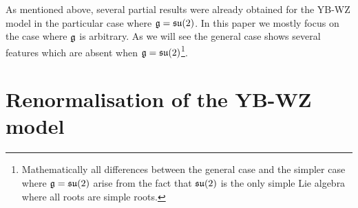 \documentclass[12pt]{article}
\begin{document}
   As mentioned above, several partial results were already obtained for the YB-WZ model in the particular case where $\frak{g} = \frak{su}(2)$. In this paper we mostly focus on the case where $\frak{g}$ is arbitrary.  As we will see the general case shows several features which are absent when $\frak{g} = \frak{su}(2)$\footnote{Mathematically all differences between the general case and the simpler case where $\frak{g} = \frak{su}(2)$ arise from the fact that $\frak{su}(2)$ is the only simple Lie algebra where all roots are simple roots.}. 
     
     
      
    
    
    
\section{Renormalisation of the YB-WZ model} \label{s2}
    
\end{document}
